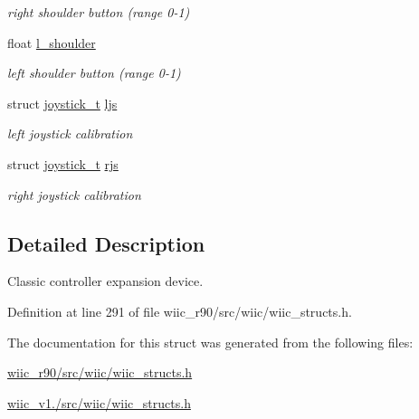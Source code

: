 \begin{DoxyCompactItemize}
\begin{DoxyCompactList}\small\item\em right shoulder button (range 0-\/1) \end{DoxyCompactList}\item 
\hypertarget{structclassic__ctrl__t_a81ab6316018923d2cc7ae436be5a46f1}{float \hyperlink{structclassic__ctrl__t_a81ab6316018923d2cc7ae436be5a46f1}{l\-\_\-shoulder}}\label{structclassic__ctrl__t_a81ab6316018923d2cc7ae436be5a46f1}

\begin{DoxyCompactList}\small\item\em left shoulder button (range 0-\/1) \end{DoxyCompactList}\item 
\hypertarget{structclassic__ctrl__t_a0fb0ee68b85831de93dffc5238bb87e0}{struct \hyperlink{structjoystick__t}{joystick\-\_\-t} \hyperlink{structclassic__ctrl__t_a0fb0ee68b85831de93dffc5238bb87e0}{ljs}}\label{structclassic__ctrl__t_a0fb0ee68b85831de93dffc5238bb87e0}

\begin{DoxyCompactList}\small\item\em left joystick calibration \end{DoxyCompactList}\item 
\hypertarget{structclassic__ctrl__t_aa27c616f6e84b2ca93e2a42bb7744fc8}{struct \hyperlink{structjoystick__t}{joystick\-\_\-t} \hyperlink{structclassic__ctrl__t_aa27c616f6e84b2ca93e2a42bb7744fc8}{rjs}}\label{structclassic__ctrl__t_aa27c616f6e84b2ca93e2a42bb7744fc8}

\begin{DoxyCompactList}\small\item\em right joystick calibration \end{DoxyCompactList}\end{DoxyCompactItemize}


\subsection{Detailed Description}
Classic controller expansion device. 

Definition at line 291 of file wiic\-\_\-r90/src/wiic/wiic\-\_\-structs.\-h.



The documentation for this struct was generated from the following files\-:\begin{DoxyCompactItemize}
\item 
\hyperlink{wiic__r90_2src_2wiic_2wiic__structs_8h}{wiic\-\_\-r90/src/wiic/wiic\-\_\-structs.\-h}\item 
\hyperlink{wiic__v1_81_2src_2wiic_2wiic__structs_8h}{wiic\-\_\-v1./src/wiic/wiic\-\_\-structs.\-h}\end{DoxyCompactItemize}
